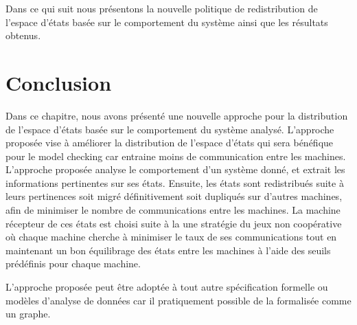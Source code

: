 Dans ce qui suit nous présentons la nouvelle politique de redistribution de l’espace d’états basée sur le comportement du système ainsi que les résultats obtenus. 
 
 



\section{Conclusion}
Dans ce chapitre, nous avons présenté une nouvelle approche pour la distribution de l’espace d'états basée sur le comportement du système analysé. L’approche proposée vise à améliorer la distribution de l'espace d'états qui sera bénéfique pour le model checking car entraine moins de communication entre les machines. L’approche proposée analyse le comportement d’un système donné, et extrait les informations pertinentes sur ses états. Ensuite, les états sont redistribués suite à leurs pertinences soit migré définitivement soit dupliqués sur d’autres machines, afin de minimiser le nombre de communications entre les machines. La machine récepteur de ces états est choisi suite à la  une stratégie du jeux non coopérative où chaque machine cherche à minimiser le taux de ses communications tout en maintenant un bon équilibrage des états entre les machines à l’aide des seuils prédéfinis pour chaque machine.

L’approche proposée peut être adoptée à tout autre spécification formelle ou modèles d'analyse de données car il pratiquement possible de la formalisée comme un graphe. 